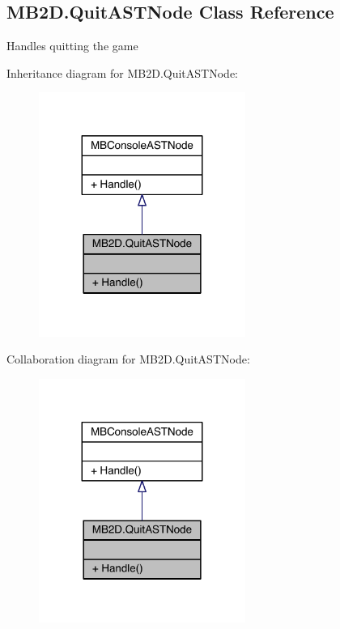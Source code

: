 \hypertarget{class_m_b2_d_1_1_quit_a_s_t_node}{}\subsection{M\+B2\+D.\+Quit\+A\+S\+T\+Node Class Reference}
\label{class_m_b2_d_1_1_quit_a_s_t_node}


Handles quitting the game  




Inheritance diagram for M\+B2\+D.\+Quit\+A\+S\+T\+Node\+:
\nopagebreak
\begin{figure}[H]
\begin{center}
\leavevmode
\includegraphics[width=191pt]{class_m_b2_d_1_1_quit_a_s_t_node__inherit__graph}
\end{center}
\end{figure}


Collaboration diagram for M\+B2\+D.\+Quit\+A\+S\+T\+Node\+:
\nopagebreak
\begin{figure}[H]
\begin{center}
\leavevmode
\includegraphics[width=191pt]{class_m_b2_d_1_1_quit_a_s_t_node__coll__graph}
\end{center}
\end{figure}

